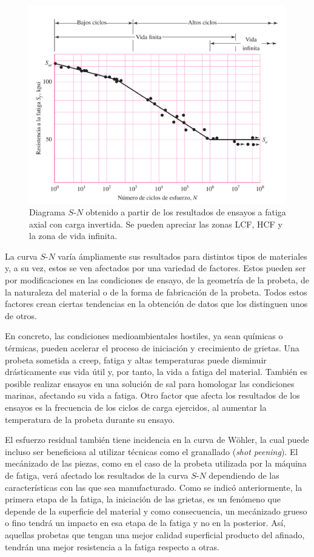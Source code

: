 \begin{figure}[h]
\centering
\includegraphics[width=0.75\linewidth]{Imagenes/lcf_hcf.pdf}
\caption{Diagrama $S$-$N$ obtenido a partir de los resultados de ensayos a fatiga axial con carga invertida. Se pueden apreciar las zonas LCF, HCF y la zona de vida infinita. \cite{budynas2008shigley}}
\label{fig:lcf_hcf}
\end{figure}

La curva $S$-$N$ varía ámpliamente sus resultados para distintos tipos de materiales y, a su vez, estos se ven afectados por una variedad de factores. Estos pueden ser por modificaciones en las condiciones de ensayo, de la geometría de la probeta, de la naturaleza del material o de la forma de fabricación de la probeta. Todos estos factores crean ciertas tendencias en la obtención de datos que los distinguen unos de otros. 

En concreto, las condiciones medioambientales hostiles, ya sean químicas o térmicas, pueden acelerar el proceso de iniciación y crecimiento de grietas. Una probeta sometida a creep, fatiga y altas temperaturas puede disminuir drásticamente sus vida útil y, por tanto, la vida a fatiga del material. También es posible realizar ensayos en una solución de sal para homologar las condiciones marinas, afectando su vida a fatiga. Otro factor que afecta los resultados de los ensayos es la frecuencia de los ciclos de carga ejercidos, al aumentar la temperatura de la probeta durante su ensayo.

El esfuerzo residual también tiene incidencia en la curva de Wöhler, la cual puede incluso ser beneficiosa al utilizar técnicas como el granallado (\textit{shot peening}). El mecánizado de las piezas, como en el caso de la probeta utilizada por la máquina de fatiga, verá afectado los resultados de la curva $S$-$N$ dependiendo de las características con las que sea manufacturado. Como se indicó anteriormente, la primera etapa de la fatiga, la iniciación de las grietas, es un fenómeno que depende de la superficie del material y como consecuencia, un mecánizado grueso o fino tendrá un impacto en esa etapa de la fatiga y no en la posterior. Así, aquellas probetas que tengan una mejor calidad superficial producto del afinado, tendrán una mejor resistencia a la fatiga respecto a otras.

